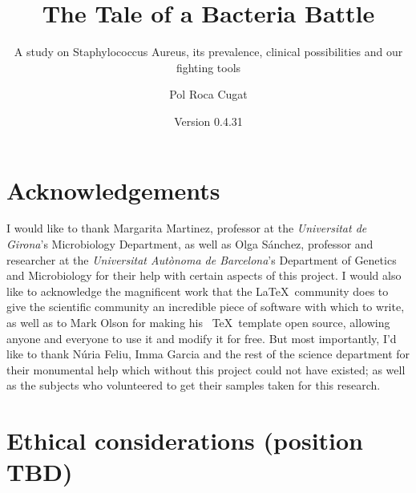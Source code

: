 \documentclass[fontsize=12pt,twoside=semi,openright,numbers=noenddot,parskip=half]{scrbook}
\title{The Tale of a Bacteria Battle}
\subtitle{A study on Staphylococcus Aureus, its prevalence, clinical possibilities and our fighting tools}
\author{Pol Roca Cugat}
\date{Version 0.4.31}
\begin{document}
\maketitle
\cleardoublepage
\renewcommand{\thepage}{\arabic{page}}
\frontmatter
\chapter{Acknowledgements}
\begin{center}
I would like to thank Margarita Martinez, professor at the \emph{Universitat de Girona}'s Microbiology Department, as well as Olga Sánchez, professor and researcher at the \emph{Universitat Autònoma de Barcelona}'s Department of Genetics and Microbiology for their help with certain aspects of this project. \newline
I would also like to acknowledge the magnificent work that the \LaTeX\ community does to give the scientific community an incredible piece of software with which to write, as well as to Mark Olson for making his \KOMAScript\ \TeX\ template open source, allowing anyone and everyone to use it and modify it for free.\newline
But most importantly, I'd like to thank Núria Feliu, Imma Garcia and the rest of the science department for their monumental help which without this project could not have existed; as well as the subjects who volunteered to get their samples taken for this research.
\end{center}
\chapter{Ethical considerations (position TBD)}
\end{document}
